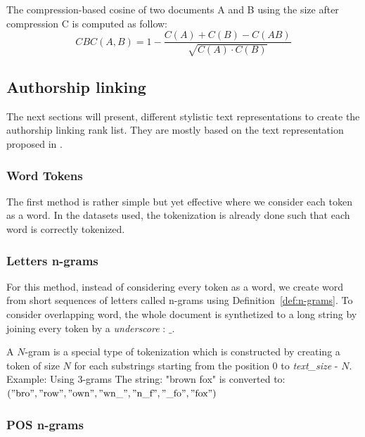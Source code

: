 \begin{definition}
  The compression-based cosine of two documents A and B using the size after compression C is computed as follow:
  \begin{equation}
    CBC(A, B) = 1 - \frac{C(A) + C(B) - C(AB)}{\sqrt{C(A) \cdot C(B)}}
  \end{equation}
\end{definition}

\subsection{Authorship linking}

The next sections will present, different stylistic text representations to create the authorship linking rank list. They are mostly based on the text representation proposed in \cite{kocher_verification}.

\subsubsection{Word Tokens}

The first method is rather simple but yet effective where we consider each token as a word.
In the datasets used, the tokenization is already done such that each word is correctly tokenized.

\subsubsection{Letters n-grams}

For this method, instead of considering every token as a word, we create word from short sequences of letters called n-grams using Definition~\ref{def:n-grams}.
To consider overlapping word, the whole document is synthetized to a long string by joining every token by a \textit{underscore} : $\_$.

\begin{definition}[$N$-Grams]
  \label{def:n-grams}
  A $N$-gram is a special type of tokenization which is constructed by creating a token of size $N$ for each substrings starting from the position $0$ to \textit{text\_size} - $N$.
  Example: Using 3-grams The string: "brown fox" is converted to: \\
  $("\text{bro}", "\text{row}", "\text{own}", "\text{wn\_}", "\text{n\_f}", "\text{\_fo}", "\text{fox}")$
\end{definition}

\subsubsection{POS n-grams}

